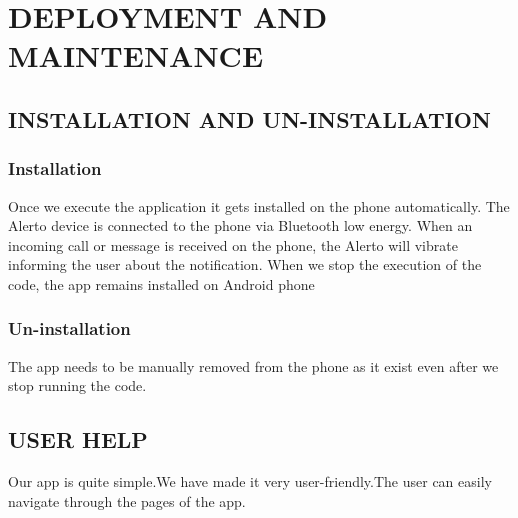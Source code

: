 \documentclass[12pt,a4paper]{report}
\begin{document}
		\begin{figure}[!h]
			\begin{center}
			\end{center}
		\end{figure}
				\begin{figure}[!h]
				\begin{center}
				\end{center}
			\end{figure}
				\begin{figure}[!h]
					\begin{center}
					\end{center}
				\end{figure}
					\begin{figure}[!h]
						\begin{center}
						\end{center}
					\end{figure}
					
\chapter{DEPLOYMENT AND MAINTENANCE}
\newpage

\section{INSTALLATION AND UN-INSTALLATION}
\subsection{Installation}
Once we execute the application it gets installed on the phone automatically. The Alerto device is connected to the phone via Bluetooth low energy. When an incoming call or message is received on the phone,  the Alerto will vibrate informing the user about the notification. When we stop the execution of the code,  the app remains installed on Android phone
\subsection{Un-installation}
The app needs to be manually removed from the phone as it exist even after we stop running the code.

\section{USER HELP}
Our app is quite simple.We have made it very user-friendly.The user can  easily navigate through the pages of the app.
\end{document}
